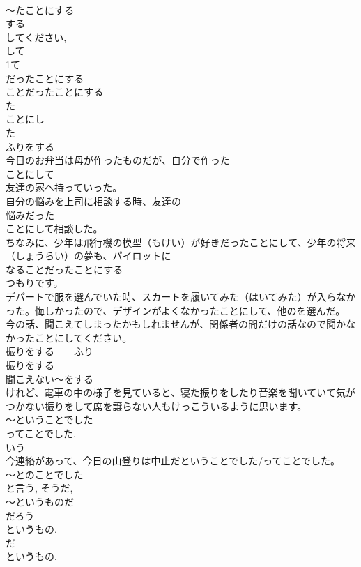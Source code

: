 \documentclass[8pt]{extreport}
\begin{document}
\begin{CJK}{UTF8}{min}
\\	～たことにする
\\	する 
\\	してください, 
\\	して 
\\	1て
\\	だったことにする
\\	ことだったことにする 
\\	た
\\	ことにし
\\	た 
\\	ふりをする
\\	今日のお弁当は母が作ったものだが、自分で作った
\\	ことにして
\\	友達の家へ持っていった。
\\	自分の悩みを上司に相談する時、友達の
\\	悩みだった
\\	ことにして相談した。
\\	ちなみに、少年は飛行機の模型（もけい）が好きだったことにして、少年の将来（しょうらい）の夢も、パイロットに
\\	なることだったことにする
\\	つもりです。
\\	デパートで服を選んでいた時、スカートを履いてみた（はいてみた）が入らなかった。悔しかったので、デザインがよくなかったことにして、他のを選んだ。
\\	今の話、聞こえてしまったかもしれませんが、関係者の間だけの話なので聞かなかったことにしてください。
\\	振りをする　　ふり
\\	振りをする
\\	聞こえない～をする　
\\	けれど、電車の中の様子を見ていると、寝た振りをしたり音楽を聞いていて気がつかない振りをして席を譲らない人もけっこういるように思います。	
\\	～ということでした
\\	ってことでした. 
\\	いう 
\\	今連絡があって、今日の山登りは中止だということでした/ってことでした。
\\	～とのことでした
\\	と言う, そうだ, 
\\	～というものだ
\\	だろう 
\\	というもの. 
\\	だ 
\\	というもの.

\end{CJK}
\end{document}
